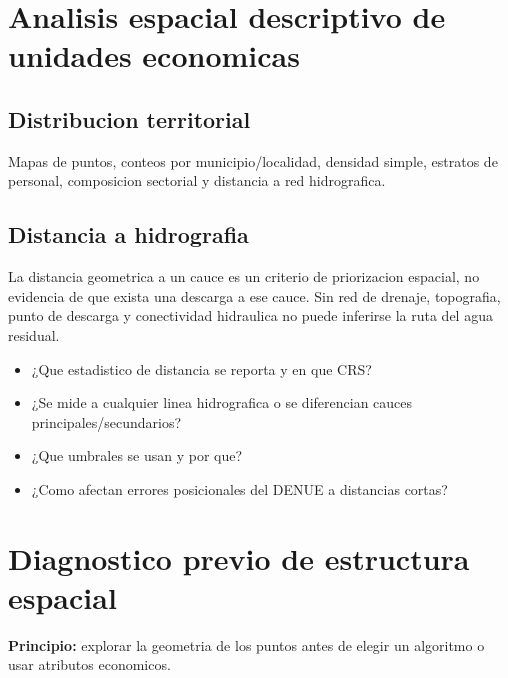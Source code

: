 \documentclass[11pt,letterpaper]{article}
\begin{document}
\section{Analisis espacial descriptivo de unidades economicas}

\subsection{Distribucion territorial}
Mapas de puntos, conteos por municipio/localidad, densidad simple, estratos de personal, composicion sectorial y distancia a red hidrografica.

\subsection{Distancia a hidrografia}
\begin{alerta}
La distancia geometrica a un cauce es un criterio de priorizacion espacial, no evidencia de que exista una descarga a ese cauce. Sin red de drenaje, topografia, punto de descarga y conectividad hidraulica no puede inferirse la ruta del agua residual.
\end{alerta}

\begin{preguntas}
\begin{itemize}
    \item ¿Que estadistico de distancia se reporta y en que CRS?
    \item ¿Se mide a cualquier linea hidrografica o se diferencian cauces principales/secundarios?
    \item ¿Que umbrales se usan y por que?
    \item ¿Como afectan errores posicionales del DENUE a distancias cortas?
\end{itemize}
\end{preguntas}

\section{Diagnostico previo de estructura espacial}

\textbf{Principio:} explorar la geometria de los puntos antes de elegir un algoritmo o usar atributos economicos.
\end{document}
